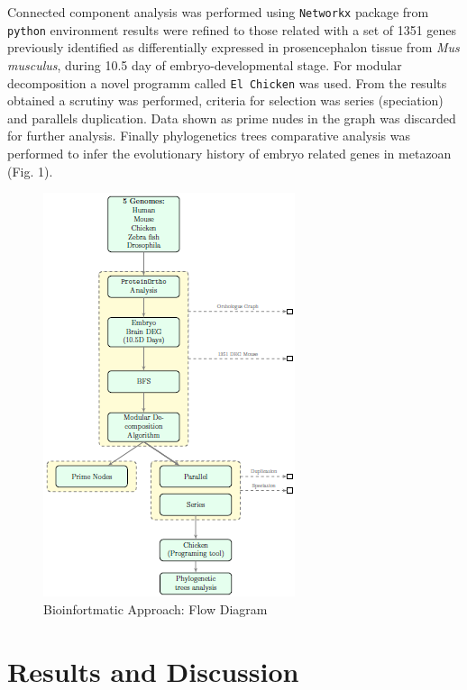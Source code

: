 \documentclass[a4paper]{article}
\begin{document}
Connected component analysis was performed using \texttt{Networkx} package from \texttt{python} environment results were refined to those related with a set of 1351 genes previously identified as differentially expressed in prosencephalon tissue from {\it Mus musculus}, during 10.5 day of embryo-developmental stage. For modular decomposition a novel programm called \texttt{El Chicken} was used. From the results obtained a scrutiny was performed, criteria for selection was series ({speciation}) and parallels {duplication}. Data shown as prime nudes in the graph was discarded for further analysis. Finally phylogenetics trees comparative analysis was performed to infer the evolutionary history of embryo related genes in metazoan (Fig. 1).


		\begin{figure}[h]
			\centering
            \includegraphics[height = 0.40\textheight]{este.png}
            \caption{Bioinfortmatic Approach: Flow Diagram}
            
		\end{figure}

\section*{Results and Discussion}
\end{document}
